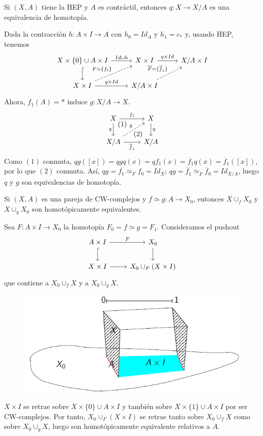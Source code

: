 \documentclass[TA.tex]{subfiles}
\begin{document}
\begin{prop}
Si $(X,A)$ tiene la HEP y $A$ es contráctil, entonces $q:X\to X/A$ es una equivalencia de homotopía. 
\end{prop}
\begin{dem}
Dada la contracción $h:A\times I\to A$ con $h_0=Id_A$ y $h_1=c_*$ y, usando HEP, tenemos
\[
\begin{tikzcd}
X\times\{0\}\cup A\times I\arrow[r, "Id\cup h"]\arrow[d, hookrightarrow] & X\times I\arrow[r, "q\times Id"] & X/A\times I\\
X\times I\arrow[ur, dashed, "F=\{f_t\}"] \arrow[r, "q\times Id"]& X/A\times I\arrow[ur, dashed, "\overline{F}=\{\overline{f}_t\}"]
\end{tikzcd}
\]
Ahora, $f_1(A)=*$ induce $g:X/A\to X$.
\[
\begin{tikzcd}
X\arrow[r, "f_1"]\arrow[d, "q"'] \arrow[dr, phantom, "(1)", very near start] & X\arrow[d, "q"]\\
X/A\arrow[ur, dashed, "g"]\arrow[r,"\overline{f}_1"'] & X/A\arrow[ul, phantom, "(2)", very near start]{tiny} 
\end{tikzcd}
\]
Como $(1)$ conmuta, $qg([x])=qgq(x)=qf_1(x)=\overline{f}_1q(x)=\overline{f}_1([x])$, por lo que $(2)$ conmuta. Así, $qg=f_1\simeq_F f_0=Id_X$; $qg=\overline{f}_1\simeq_{\overline{F}}\overline{f}_0=Id_{X/A}$, luego $q$ y $g$ son equivalencias de homotopía. 
\end{dem}

\begin{prop}
Si $(X,A)$ es una pareja de CW-complejos y $f\simeq g:A\to X_0$, entonces $X\cup_f X_0$ y $X\cup_g X_0$ son homotópicamente equivalentes. 
\end{prop}
\begin{dem}
Sea $F:A\times I\to X_0$ la homotopía $F_0=f\simeq g=F_1$. Consideramos el pushout
\[
\begin{tikzcd}
A\times I\arrow[d,hookrightarrow]\arrow[r, "F"] & X_0\arrow[d]\\
X\times I\arrow[r] & X_0\cup_F (X\times I)
\end{tikzcd}
\]
que contiene a $X_0\cup_f X$ y a $X_0\cup_g X$.

\begin{figure}[h!]
\includegraphics[scale=0.5]{retract}
\end{figure}

$X\times I$ se retrae sobre $X\times\{0\}\cup A\times I$ y también sobre $X\times\{1\}\cup A\times I$ por ser CW-complejos. Por tanto, $X_0\cup_F(X\times I)$ se retrae tanto sobre $X_0\cup_f X$ como sobre $X_0\cup_g X$, luego son homotópicamente equivalente relativos a $A$.
\end{dem}
\end{document}
